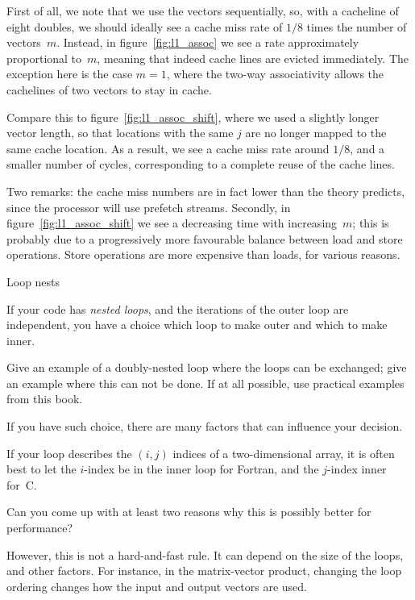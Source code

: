 First of all, we note that we use the vectors sequentially, so, with a
cacheline of eight doubles, we should ideally see a cache miss rate of
$1/8$ times the number of vectors~$m$. Instead, in
figure~\ref{fig:l1_assoc} we see a rate approximately proportional
to~$m$, meaning that indeed cache lines are evicted immediately. The
exception here is the case $m=1$, where the two-way associativity
allows the cachelines of two vectors to stay in cache.

Compare this to figure~\ref{fig:l1_assoc_shift}, where we used a
slightly longer vector length, so that locations with the same $j$ are
no longer mapped to the same cache location. As a result, we see a
cache miss rate around $1/8$, and a smaller number of cycles,
corresponding to a complete reuse of the cache lines. 

Two remarks: the cache miss numbers are in fact lower than the theory
predicts, since the processor will use prefetch streams. Secondly, in
figure~\ref{fig:l1_assoc_shift} we see a decreasing time with
increasing~$m$; this is probably due to a progressively more
favourable balance between load and store operations. Store operations
are more expensive than loads, for various reasons.

 {Loop nests}

If your code has \emph{nested loops}, and the iterations of the outer
loop are independent, you have a choice which loop to make outer and
which to make inner.

\begin{exercise}
  Give an example of a doubly-nested loop where the loops can be
  exchanged; give an example where this can not be done. If at all
  possible, use practical examples from this book.
\end{exercise}

If you have such choice, there are many factors that can influence
your decision.

%
If your loop describes the $(i,j)$ indices of a two-dimensional array,
it is often best to let the $i$-index be in the inner loop for
Fortran, and the $j$-index inner for~C.

\begin{exercise}
  Can you come up with at least two reasons why this is possibly better for performance?
\end{exercise}

However, this is not a hard-and-fast rule. It can depend on the size
of the loops, and other factors. For instance, in the matrix-vector
product, changing the loop ordering changes how the input and output
vectors are used.

